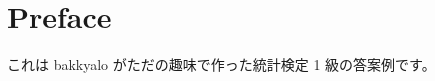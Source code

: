 \documentclass[./main.tex]{subfiles}
\begin{document}
    \section*{Preface}

    これは bakkyalo がただの趣味で作った統計検定 1 級の答案例です。
\end{document}
